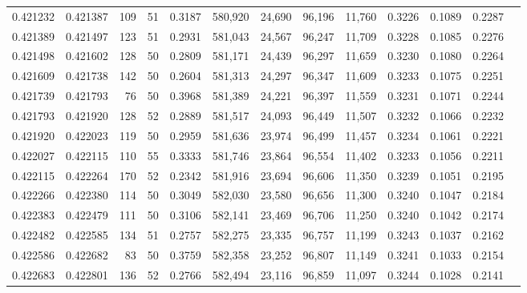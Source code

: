 \begin{tabular}{rrrrrrrrrrrrr}
0.421232 & 0.421387 &   109 &  51 &                                     0.3187 & 580,920 &  24,690 &  96,196 &  11,760 & 0.3226 & 0.1089 & 0.2287 \\
0.421389 & 0.421497 &   123 &  51 &                                     0.2931 & 581,043 &  24,567 &  96,247 &  11,709 & 0.3228 & 0.1085 & 0.2276 \\
0.421498 & 0.421602 &   128 &  50 &                                     0.2809 & 581,171 &  24,439 &  96,297 &  11,659 & 0.3230 & 0.1080 & 0.2264 \\
0.421609 & 0.421738 &   142 &  50 &                                     0.2604 & 581,313 &  24,297 &  96,347 &  11,609 & 0.3233 & 0.1075 & 0.2251 \\
0.421739 & 0.421793 &    76 &  50 &                                     0.3968 & 581,389 &  24,221 &  96,397 &  11,559 & 0.3231 & 0.1071 & 0.2244 \\
0.421793 & 0.421920 &   128 &  52 &                                     0.2889 & 581,517 &  24,093 &  96,449 &  11,507 & 0.3232 & 0.1066 & 0.2232 \\
0.421920 & 0.422023 &   119 &  50 &                                     0.2959 & 581,636 &  23,974 &  96,499 &  11,457 & 0.3234 & 0.1061 & 0.2221 \\
0.422027 & 0.422115 &   110 &  55 &                                     0.3333 & 581,746 &  23,864 &  96,554 &  11,402 & 0.3233 & 0.1056 & 0.2211 \\
0.422115 & 0.422264 &   170 &  52 &                                     0.2342 & 581,916 &  23,694 &  96,606 &  11,350 & 0.3239 & 0.1051 & 0.2195 \\
0.422266 & 0.422380 &   114 &  50 &                                     0.3049 & 582,030 &  23,580 &  96,656 &  11,300 & 0.3240 & 0.1047 & 0.2184 \\
0.422383 & 0.422479 &   111 &  50 &                                     0.3106 & 582,141 &  23,469 &  96,706 &  11,250 & 0.3240 & 0.1042 & 0.2174 \\
0.422482 & 0.422585 &   134 &  51 &                                     0.2757 & 582,275 &  23,335 &  96,757 &  11,199 & 0.3243 & 0.1037 & 0.2162 \\
0.422586 & 0.422682 &    83 &  50 &                                     0.3759 & 582,358 &  23,252 &  96,807 &  11,149 & 0.3241 & 0.1033 & 0.2154 \\
0.422683 & 0.422801 &   136 &  52 &                                     0.2766 & 582,494 &  23,116 &  96,859 &  11,097 & 0.3244 & 0.1028 & 0.2141 \\

\end{tabular}
